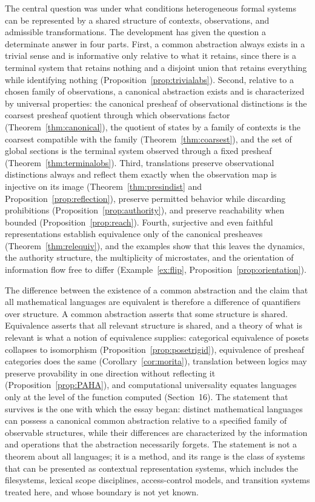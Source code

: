 The central question was under what conditions heterogeneous formal systems can be represented by a shared structure of contexts, observations, and admissible transformations. The development has given the question a determinate answer in four parts. First, a common abstraction always exists in a trivial sense and is informative only relative to what it retains, since there is a terminal system that retains nothing and a disjoint union that retains everything while identifying nothing (Proposition~\ref{prop:trivialabs}). Second, relative to a chosen family of observations, a canonical abstraction exists and is characterized by universal properties: the canonical presheaf of observational distinctions is the coarsest presheaf quotient through which observations factor (Theorem~\ref{thm:canonical}), the quotient of states by a family of contexts is the coarsest compatible with the family (Theorem~\ref{thm:coarsest}), and the set of global sections is the terminal system observed through a fixed presheaf (Theorem~\ref{thm:terminalobs}). Third, translations preserve observational distinctions always and reflect them exactly when the observation map is injective on its image (Theorem~\ref{thm:presindist} and Proposition~\ref{prop:reflection}), preserve permitted behavior while discarding prohibitions (Proposition~\ref{prop:authority}), and preserve reachability when bounded (Proposition~\ref{prop:reach}). Fourth, surjective and even faithful representations establish equivalence only of the canonical presheaves (Theorem~\ref{thm:relequiv}), and the examples show that this leaves the dynamics, the authority structure, the multiplicity of microstates, and the orientation of information flow free to differ (Example~\ref{ex:flip}, Proposition~\ref{prop:orientation}).

The difference between the existence of a common abstraction and the claim that all mathematical languages are equivalent is therefore a difference of quantifiers over structure. A common abstraction asserts that some structure is shared. Equivalence asserts that all relevant structure is shared, and a theory of what is relevant is what a notion of equivalence supplies: categorical equivalence of posets collapses to isomorphism (Proposition~\ref{prop:posetrigid}), equivalence of presheaf categories does the same (Corollary~\ref{cor:morita}), translation between logics may preserve provability in one direction without reflecting it (Proposition~\ref{prop:PAHA}), and computational universality equates languages only at the level of the function computed (Section~16). The statement that survives is the one with which the essay began: distinct mathematical languages can possess a canonical common abstraction relative to a specified family of observable structures, while their differences are characterized by the information and operations that the abstraction necessarily forgets. The statement is not a theorem about all languages; it is a method, and its range is the class of systems that can be presented as contextual representation systems, which includes the filesystems, lexical scope disciplines, access-control models, and transition systems treated here, and whose boundary is not yet known.

